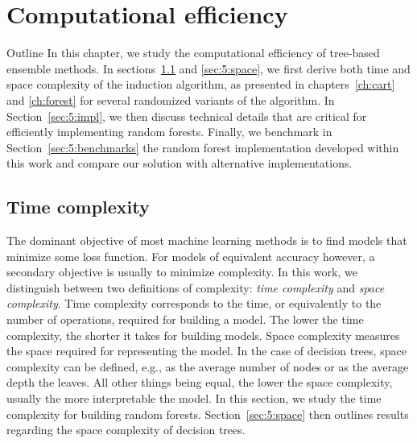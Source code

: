 \chapter{Computational efficiency}\label{ch:complexity}

\begin{remark}{Outline}
In this chapter, we study the computational efficiency of tree-based ensemble
methods. In sections~\ref{sec:5:time} and \ref{sec:5:space}, we first derive both time and space
complexity of the induction algorithm, as presented in chapters~\ref{ch:cart}
and \ref{ch:forest} for several randomized variants of the algorithm. In
Section~\ref{sec:5:impl}, we then discuss technical details that are critical
for efficiently  implementing random forests. Finally, we benchmark in
Section~\ref{sec:5:benchmarks} the random forest implementation developed
within this work and compare our solution with alternative implementations.
\end{remark}

\section{Time complexity}
\label{sec:5:time}

The dominant objective of most machine learning methods is to find models that
minimize some loss function. For models of equivalent accuracy however, a
secondary objective is usually to minimize complexity. In this work, we
distinguish between two definitions of complexity: \textit{time complexity} and
\textit{space complexity}. Time complexity corresponds to the time, or
equivalently to the number of operations, required for building a model. The
lower the time complexity, the shorter it takes for building models. Space
complexity measures the space required for representing the model. In the case
of decision trees, space complexity can be defined, e.g., as the average number
of nodes or as the average depth the leaves. All other things being equal, the
lower the space complexity, usually the more interpretable the model. In this
section, we study the time complexity for building random forests.
Section~\ref{sec:5:space} then outlines results regarding the space
complexity of decision trees.

